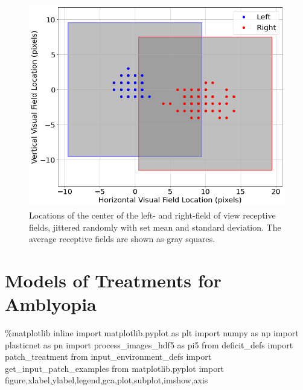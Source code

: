 \documentclass[
  letterpaper,
  DIV=11,
  numbers=noendperiod]{scrreprt}
\newenvironment{Shaded}{\begin{snugshade}}{\end{snugshade}}
\newcommand{\ImportTok}[1]{\textcolor[rgb]{0.00,0.46,0.62}{#1}}
\newcommand{\NormalTok}[1]{\textcolor[rgb]{0.00,0.23,0.31}{#1}}
\newcommand{\OperatorTok}[1]{\textcolor[rgb]{0.37,0.37,0.37}{#1}}
\begin{document}
\begin{figure}[H]

{\centering \includegraphics{./Deficit Models_files/figure-pdf/fig-jitter-input-locations-output-1.png}

}

\caption{\label{fig-jitter-input-locations}Locations of the center of
the left- and right-field of view receptive fields, jittered randomly
with set mean and standard deviation. The average receptive fields are
shown as gray squares.}

\end{figure}

\hypertarget{sec-models-of-treatments}{%
\chapter{Models of Treatments for
Amblyopia}\label{sec-models-of-treatments}}

\begin{Shaded}
\begin{Highlighting}[]
\OperatorTok{\%}\NormalTok{matplotlib inline}
\ImportTok{import}\NormalTok{ matplotlib.pyplot }\ImportTok{as}\NormalTok{ plt}
\ImportTok{import}\NormalTok{ numpy }\ImportTok{as}\NormalTok{ np}
\ImportTok{import}\NormalTok{ plasticnet }\ImportTok{as}\NormalTok{ pn}
\ImportTok{import}\NormalTok{ process\_images\_hdf5 }\ImportTok{as}\NormalTok{ pi5}
\ImportTok{from}\NormalTok{ deficit\_defs }\ImportTok{import}\NormalTok{ patch\_treatment}
\ImportTok{from}\NormalTok{ input\_environment\_defs }\ImportTok{import}\NormalTok{ get\_input\_patch\_examples}
\ImportTok{from}\NormalTok{ matplotlib.pyplot }\ImportTok{import}\NormalTok{ figure,xlabel,ylabel,legend,gca,plot,subplot,imshow,axis}
\end{Highlighting}
\end{Shaded}
\end{document}
